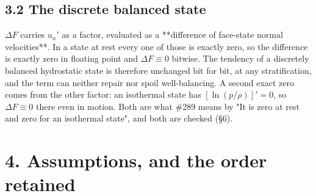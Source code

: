 \documentclass[11pt,a4paper]{article}
\begin{document}
\subsection*{3.2 The discrete balanced state}

$\Delta F$ carries $u_n'$ as a factor, evaluated as a **difference of face-state
normal velocities**. In a state at rest every one of those is exactly zero, so
the difference is exactly zero in floating point and $\Delta F\equiv0$ bitwise.
The tendency of a discretely balanced hydrostatic state is therefore unchanged
bit for bit, at any stratification, and the term can neither repair nor spoil
well-balancing. A second exact zero comes from the other factor: an isothermal
state has $[\ln(p/\rho)]'=0$, so $\Delta F\equiv0$ there even in motion. Both are
what \#289 means by "It is zero at rest and zero for an isothermal state", and
both are checked (§6).

\hrulefill

\section*{4. Assumptions, and the order retained}
\end{document}

